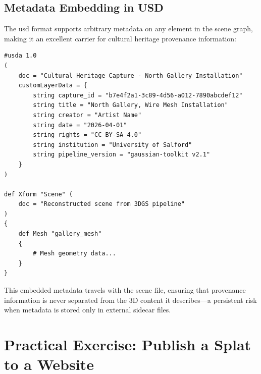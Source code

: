 \subsection{Metadata Embedding in USD}

The \acrlong{usd} format supports arbitrary metadata on any element in the scene graph, making it an excellent carrier for cultural heritage provenance information:

\begin{lstlisting}[language={}, caption={Embedding cultural heritage metadata in a USD scene.}, label={lst:usd-metadata}]
#usda 1.0
(
    doc = "Cultural Heritage Capture - North Gallery Installation"
    customLayerData = {
        string capture_id = "b7e4f2a1-3c89-4d56-a012-7890abcdef12"
        string title = "North Gallery, Wire Mesh Installation"
        string creator = "Artist Name"
        string date = "2026-04-01"
        string rights = "CC BY-SA 4.0"
        string institution = "University of Salford"
        string pipeline_version = "gaussian-toolkit v2.1"
    }
)

def Xform "Scene" (
    doc = "Reconstructed scene from 3DGS pipeline"
)
{
    def Mesh "gallery_mesh"
    {
        # Mesh geometry data...
    }
}
\end{lstlisting}

This embedded metadata travels with the scene file, ensuring that provenance information is never separated from the 3D content it describes---a persistent risk when metadata is stored only in external sidecar files.

\section{Practical Exercise: Publish a Splat to a Website}
\label{sec:view-exercise}


